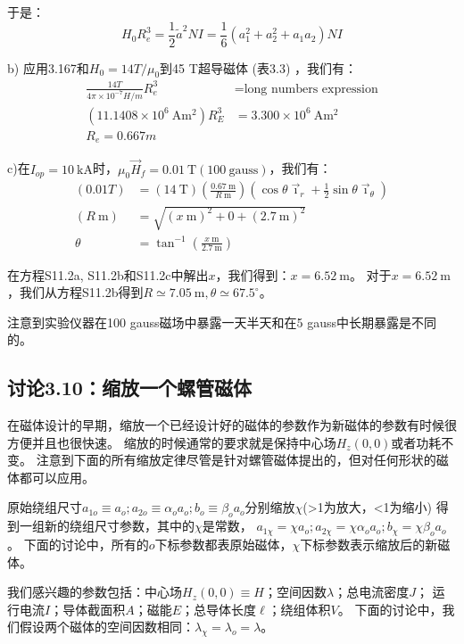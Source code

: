 于是：
\begin{equation*}
H_{0}R_{e}^{3}=\frac{1}{2}\tilde{a}^{2}NI=\frac{1}{6}(a_{1}^{2}+a_{2}^{2}+a_{1}a_{2})NI\tag{3.165}%
\end{equation*}

b) 应用3.167和$H_0=14 T/\mu_0$到45 T超导磁体 (表3.3) ，我们有：
\begin{eqnarray*}
\frac{14 T}{4\pi\times 10^{-7}H/m} R_e^3&= \mbox{long numbers expression}\\
(11.1408\times 10^6\ \mathrm{Am^2})R_E^3&=3.300\times 10^6\ \mathrm{Am^2} \\
R_e=0.667 m
\end{eqnarray*}

c)在$I_{op}=10\ \mathrm{kA}$时，$\mu_0 \vec{H}_f=0.01\ \mathrm{T}(100\ \mathrm{gauss})$，我们有：
\begin{align*}
(0.01T)&=(14\ \mathrm{T})(\frac{0.67\ \mathrm{m}}{R\ \mathrm{m}})(\cos\theta\vec{\imath}_{r}+\frac{1}{2}\sin\theta\vec{\imath}_{\theta})\tag{S11.2a}\\
(R\ \mathrm{m})&=\sqrt{(x\ \mathrm{m})^{2}+0+(2.7\ \mathrm{m})^{2}}\tag{S11.2b}\\%
\theta&=\tan^{-1}(\frac{x\ \mathrm{m}}{2.7\ \mathrm{m}})\tag{S11.2c}%
\end{align*}

在方程S11.2a, S11.2b和S11.2c中解出$x$，我们得到：$x=6.52\ \mathrm{m}$。
对于$x=6.52\ \mathrm{m}$，我们从方程S11.2b得到$R\simeq 7.05\ \mathrm{m}, \theta\simeq 67.5^\circ$。

注意到实验仪器在100 gauss磁场中暴露一天半天和在5 gauss中长期暴露是不同的。



\subsection{讨论3.10：缩放一个螺管磁体}
在磁体设计的早期，缩放一个已经设计好的磁体的参数作为新磁体的参数有时候很方便并且也很快速。
缩放的时候通常的要求就是保持中心场$H_z(0,0)$或者功耗不变。
注意到下面的所有缩放定律尽管是针对螺管磁体提出的，但对任何形状的磁体都可以应用。

原始绕组尺寸$a_{1o}\equiv a_o;a_{2o}\equiv\alpha_o a_o;b_o\equiv \beta_o a_o$分别缩放$\chi$(>1为放大，<1为缩小)
得到一组新的绕组尺寸参数，其中的$\chi$是常数，
$a_{1\chi}=\chi a_o;a_{2\chi}=\chi\alpha_o a_o; b_\chi=\chi \beta_o a_o$。
下面的讨论中，所有的$o$下标参数都表原始磁体，$\chi$下标参数表示缩放后的新磁体。

我们感兴趣的参数包括：中心场$H_z(0, 0)\equiv H$；空间因数$\lambda$；总电流密度$J$；
运行电流$I$；导体截面积$A$；磁能$E$；总导体长度$\ell$；绕组体积$V$。
下面的讨论中，我们假设两个磁体的空间因数相同：$\lambda_\chi=\lambda_o=\lambda$。 

